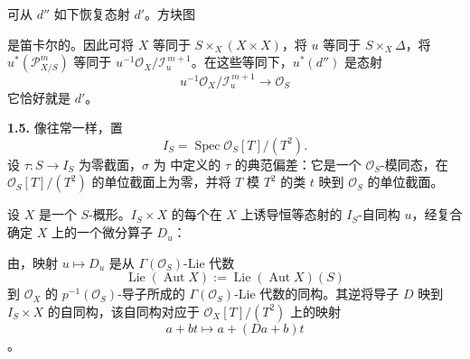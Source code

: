 可从 \(d''\) 如下恢复态射 \(d'\)。方块图
\begin{center}
  \label{sga3:VIIA:1.4.2-value-cartesian-square}
  
\end{center}
是笛卡尔的。因此可将 \(X\) 等同于 \(S\times_X(X\times X)\)，将 \(u\) 等同于 \(S\times_X\Delta\)，将 \(u^*(\mathcal P^m_{X/S})\) 等同于 \(u^{-1}\mathcal O_X/\mathcal I_u^{\,m+1}\)。在这些等同下，\(u^*(d'')\) 是态射
\[
  u^{-1}\mathcal O_X/\mathcal I_u^{\,m+1}\longrightarrow\mathcal O_S
\]
它恰好就是 \(d'\)。

\medskip
\noindent\textbf{1.5.}
\label{sga3:VIIA:1.5}
像往常一样，置
\[
  I_S=\operatorname{Spec}\mathcal O_S[T]/(T^2).
\]
设 \(\tau:S\to I_S\) 为零截面，\(\sigma\) 为  中定义的 \(\tau\) 的典范偏差：它是一个 \(\mathcal O_S\)-模同态，在 \(\mathcal O_S[T]/(T^2)\) 的单位截面上为零，并将 \(T\) 模 \(T^2\) 的类 \(t\) 映到 \(\mathcal O_S\) 的单位截面。

设 \(X\) 是一个 \(S\)-概形。\(I_S\times X\) 的每个在 \(X\) 上诱导恒等态射的 \(I_S\)-自同构 \(u\)，经复合确定 \(X\) 上的一个微分算子 \(D_u\)：
\begin{center}
  \label{sga3:VIIA:1.5-infinitesimal-automorphism-sequence}
  
\end{center}
由，映射 \(u\mapsto D_u\) 是从 \(\Gamma(\mathcal O_S)\)-Lie 代数
\[
  \operatorname{Lie}(\operatorname{Aut}X)
  :=\operatorname{Lie}(\operatorname{Aut}X)(S)
\]
到 \(\mathcal O_X\) 的 \(p^{-1}(\mathcal O_S)\)-导子所成的 \(\Gamma(\mathcal O_S)\)-Lie 代数的同构。其逆将导子 \(D\) 映到 \(I_S\times X\) 的自同构，该自同构对应于 \(\mathcal O_X[T]/(T^2)\) 上的映射
\[
  a+bt\longmapsto a+(Da+b)t
\]
。

